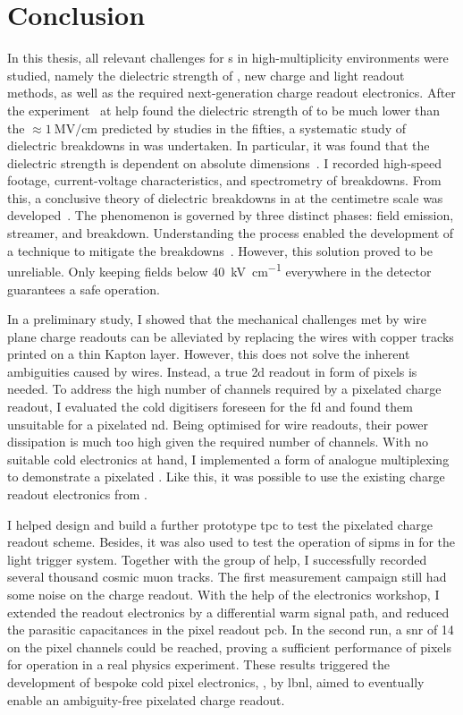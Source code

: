 \chapter{Conclusion}
\label{chap:conclusion}

In this thesis, all relevant challenges for \lartpc{}s in high-multiplicity environments were studied, namely the dielectric strength of \lar{}, new charge and light readout methods, as well as the required next-generation charge readout electronics.
After the \AT{} experiment~\cite{AT} at \gls{help} found the dielectric strength of \lar{} to be much lower than the $\approx \SI{1}{\mega\volt\per\centi\metre}$ predicted by studies in the fifties, a systematic study of dielectric breakdowns in \lar{} was undertaken.
In particular, it was found that the dielectric strength is dependent on absolute dimensions~\cite{breakdown_14}.
I recorded high-speed footage, current-voltage characteristics, and spectrometry of breakdowns.
From this, a conclusive theory of dielectric breakdowns in \lar{} at the centimetre scale was developed~\cite{breakdown_16}.
The phenomenon is governed by three distinct phases: field emission, streamer, and breakdown.
Understanding the process enabled the development of a technique to mitigate the breakdowns~\cite{latex}.
However, this solution proved to be unreliable.
Only keeping fields below \SI{40}{\kilo\volt\per\centi\metre} everywhere in the detector guarantees a safe operation.

In a preliminary study, I showed that the mechanical challenges met by wire plane charge readouts can be alleviated by replacing the wires with copper tracks printed on a thin Kapton layer.
However, this does not solve the inherent ambiguities caused by wires.
Instead, a true \gls{2d} readout in form of pixels is needed.
To address the high number of channels required by a pixelated charge readout, I evaluated the cold digitisers foreseen for the \dune{} \gls{fd} and found them unsuitable for a pixelated \gls{nd}.
Being optimised for wire readouts, their power dissipation is much too high given the required number of channels.
With no suitable cold electronics at hand, I implemented a form of analogue multiplexing to demonstrate a pixelated \lartpc{}.
Like this, it was possible to use the existing charge readout electronics from \AT{}.

I helped design and build a further prototype \gls{tpc} to test the pixelated charge readout scheme.
Besides, it was also used to test the operation of \glspl{sipm} in \lar{} for the light trigger system.
Together with the \lar{} group of \gls{help}, I successfully recorded several thousand cosmic muon tracks.
The first measurement campaign still had some noise on the charge readout.
With the help of the electronics workshop, I extended the \AT{} readout electronics by a differential warm signal path, and reduced the parasitic capacitances in the pixel readout \gls{pcb}.
In the second run, a \gls{snr} of \num{14} on the pixel channels could be reached, proving a sufficient performance of pixels for operation in a real physics experiment.
These results triggered the development of bespoke cold pixel electronics, \larpix{}, by \gls{lbnl}, aimed to eventually enable an ambiguity-free pixelated \lartpc{} charge readout.

